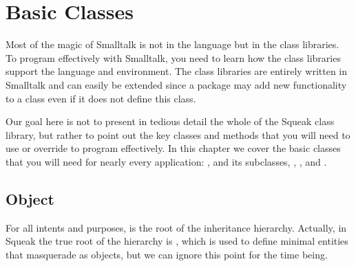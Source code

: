 \documentclass[a4paper,10pt,twoside]{book}
\begin{document}
	\renewcommand{\nnbb}[2]{} %
	\sloppy
\fi
\chapter{Basic Classes}
\label{cha:basic}

Most of the magic of Smalltalk is not in the language but in the class libraries. To program effectively with Smalltalk, you need to learn how the class libraries support the language and environment. The class libraries are entirely written in Smalltalk and can easily be extended since a package may add new functionality to a class even if it does not define this class. 

Our goal here is not to present in tedious detail the whole of the Squeak class library, but rather to point out the key classes and methods that you will need to use or override to program effectively. In this chapter we cover the basic classes that you will need for nearly every application: ,  and its subclasses, , ,  and .


\section{Object}
For all intents and purposes,  is the root of the inheritance hierarchy. Actually, in Squeak the true root of the hierarchy is , which is used to define minimal entities that masquerade as objects, but we can ignore this point for the time being.
\end{document}
